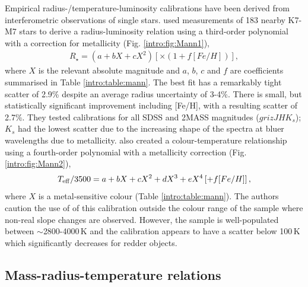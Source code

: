 Empirical radius-/temperature-luminosity calibrations have been derived from interferometric observations of single stars. \citet{2015ApJ...804...64M} used measurements of 183 nearby K7-M7 stars to derive a radius-luminosity relation using a third-order polynomial with a correction for metallicity (Fig. \ref{intro:fig:Mann1}),
%
\begin{eqnarray}
    R_\star =  \left( a + bX + cX^2 \right) \left[ \times \left( 1 + f[Fe/H] \right) \right],
\end{eqnarray}
%
where $X$ is the relevant absolute magnitude and $a$, $b$, $c$ and $f$ are coefficients summarised in Table \ref{intro:table:mann}. The best fit has a remarkably tight scatter of 2.9\% despite an average radius uncertainty of 3-4\%. There is small, but statistically significant improvement including [Fe/H], with a resulting scatter of 2.7\%. 
They tested calibrations for all SDSS and 2MASS magnitudes ($grizJHK_s$); $K_s$ had the lowest scatter due to the increasing shape of the spectra at bluer wavelengths due to metallicity. \citet{2015ApJ...804...64M} also created a colour-temperature relationship using a fourth-order polynomial with a metallicity correction (Fig. \ref{intro:fig:Mann2}),
%
\begin{equation}
    T_{\rm eff}/3500 = a + bX + cX^2 + dX^3 + eX^4 \left[ + f[Fe/H] \right],
\end{equation}
%
where $X$ is a metal-sensitive colour (Table \ref{intro:table:mann}). The authors caution the use of of this calibration outside the colour range of the sample where non-real slope changes are observed. However, the sample is well-populated between $\sim$2800-4000\,K and the calibration appears to have a scatter below 100\,K which significantly decreases for redder objects.  



\subsection{Mass-radius-temperature relations}



